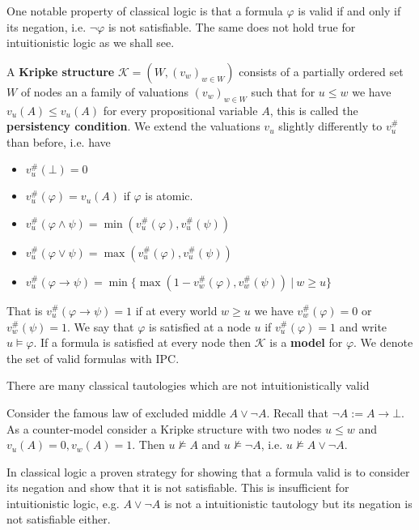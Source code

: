 \documentclass[a4paper,UKenglish,cleveref, autoref, thm-restate]{lipics-v2021}
\begin{document}
One notable property of classical logic is that a formula $\varphi$ is valid if and only if its negation, i.e. $\neg\varphi$ is not satisfiable. The same does not hold true for intuitionistic logic as we shall see.

\begin{definition}
	A \textbf{Kripke structure} $\mathcal K = (W, (v_w)_{w\in W})$ consists of a partially ordered set $W$ of nodes an a family of valuations $(v_w)_{w\in W}$ such that for $u\leq w$ we have $v_u(A)\leq v_u(A)$ for every propositional variable $A$, this is called the \textbf{persistency condition}. We extend the valuations $v_u$ slightly differently to $v_u^\#$ than before, i.e. have
	\begin{itemize}
		\item $v_u^\#(\bot) = 0$
		\item $v_u^\#(\varphi) = v_u(A)$ if $\varphi$ is atomic.
		\item $v_u^\#(\varphi\wedge\psi) = \min(v_u^\#(\varphi), v_u^\#(\psi))$
		\item $v_u^\#(\varphi\vee\psi) = \max(v_u^\#(\varphi), v_u^\#(\psi))$
		\item $v_u^\#(\varphi\to \psi) = \min\{\max(1 - v_w^\#(\varphi), v_w^\#(\psi))\:|\:w\geq u\}$
	\end{itemize}
	That is $v_u^\#(\varphi\to \psi) = 1$ if at every world $w\geq u$ we have $v_w^\#(\varphi) = 0$ or $v_w^\#(\psi) = 1$. We say that $\varphi$ is satisfied at a node $u$ if $v_u^\#(\varphi) = 1$ and write $u\models\varphi$. If a formula is satisfied at every node then $\mathcal K$ is a \textbf{model} for $\varphi$. We denote the set of valid formulas with IPC.
\end{definition}
There are many classical tautologies which are not intuitionistically valid
\begin{example}\label{LEMcounterexample}
	Consider the famous law of excluded middle $A\vee\neg A$. Recall that $\neg A := A\to \bot$. As a counter-model consider a Kripke structure with two nodes $u\leq w$ and $v_u(A) = 0, v_w(A) = 1$. Then $u\not\models A$ and $u\not\models \neg A$, i.e. $u\not\models A\vee\neg A$. 
\end{example}
In classical logic a proven strategy for showing that a formula valid is to consider its negation and show that it is not satisfiable. This is insufficient for intuitionistic logic, e.g. $A\vee\neg A$ is not a intuitionistic tautology but its negation is not satisfiable either.
\end{document}
